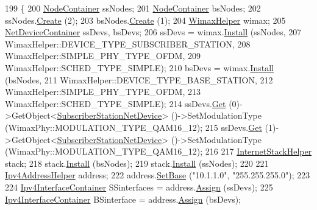 \begin{DoxyCode}
199 \{
200   \hyperlink{classns3_1_1NodeContainer}{NodeContainer} ssNodes;
201   \hyperlink{classns3_1_1NodeContainer}{NodeContainer} bsNodes;
202   ssNodes.\hyperlink{classns3_1_1NodeContainer_a787f059e2813e8b951cc6914d11dfe69}{Create} (2);
203   bsNodes.\hyperlink{classns3_1_1NodeContainer_a787f059e2813e8b951cc6914d11dfe69}{Create} (1);
204   \hyperlink{classns3_1_1WimaxHelper}{WimaxHelper} wimax;
205   \hyperlink{classns3_1_1NetDeviceContainer}{NetDeviceContainer} ssDevs, bsDevs;
206   ssDevs = wimax.\hyperlink{classns3_1_1WimaxHelper_a9f0848e09c4b6db9cdde9872b38f6349}{Install} (ssNodes,
207                           WimaxHelper::DEVICE\_TYPE\_SUBSCRIBER\_STATION,
208                           WimaxHelper::SIMPLE\_PHY\_TYPE\_OFDM,
209                           WimaxHelper::SCHED\_TYPE\_SIMPLE);
210   bsDevs = wimax.\hyperlink{classns3_1_1WimaxHelper_a9f0848e09c4b6db9cdde9872b38f6349}{Install} (bsNodes,
211                           WimaxHelper::DEVICE\_TYPE\_BASE\_STATION,
212                           WimaxHelper::SIMPLE\_PHY\_TYPE\_OFDM,
213                           WimaxHelper::SCHED\_TYPE\_SIMPLE);
214   ssDevs.\hyperlink{classns3_1_1NetDeviceContainer_a677d62594b5c9d2dea155cc5045f4d0b}{Get} (0)->GetObject<\hyperlink{classns3_1_1SubscriberStationNetDevice}{SubscriberStationNetDevice}> ()->SetModulationType 
      (WimaxPhy::MODULATION\_TYPE\_QAM16\_12);
215   ssDevs.\hyperlink{classns3_1_1NetDeviceContainer_a677d62594b5c9d2dea155cc5045f4d0b}{Get} (1)->GetObject<\hyperlink{classns3_1_1SubscriberStationNetDevice}{SubscriberStationNetDevice}> ()->SetModulationType 
      (WimaxPhy::MODULATION\_TYPE\_QAM16\_12);
216 
217   \hyperlink{classns3_1_1InternetStackHelper}{InternetStackHelper} stack;
218   stack.\hyperlink{classns3_1_1InternetStackHelper_a6645b412f31283d2d9bc3d8a95cebbc0}{Install} (bsNodes);
219   stack.\hyperlink{classns3_1_1InternetStackHelper_a6645b412f31283d2d9bc3d8a95cebbc0}{Install} (ssNodes);
220 
221   \hyperlink{classns3_1_1Ipv4AddressHelper}{Ipv4AddressHelper} address;
222   address.\hyperlink{classns3_1_1Ipv4AddressHelper_acf7b16dd25bac67e00f5e25f90a9a035}{SetBase} (\textcolor{stringliteral}{"10.1.1.0"}, \textcolor{stringliteral}{"255.255.255.0"});
223 
224   \hyperlink{classns3_1_1Ipv4InterfaceContainer}{Ipv4InterfaceContainer} SSinterfaces = address.\hyperlink{classns3_1_1Ipv4AddressHelper_af8e7f4a1a7e74c00014a1eac445a27af}{Assign} (ssDevs);
225   \hyperlink{classns3_1_1Ipv4InterfaceContainer}{Ipv4InterfaceContainer} BSinterface = address.\hyperlink{classns3_1_1Ipv4AddressHelper_af8e7f4a1a7e74c00014a1eac445a27af}{Assign} (bsDevs);

\end{DoxyCode}
